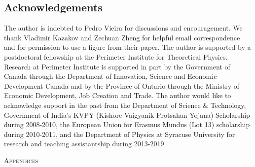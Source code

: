 \documentclass[11pt]{article}
\begin{document}
\subsection*{Acknowledgements}
The author is indebted to Pedro Vieira
for discussions and encouragement. We thank Vladimir Kazakov 
and Zechuan Zheng for helpful email correspondence and for 
permission to use a figure from their paper. The author is supported by a 
postdoctoral fellowship at the Perimeter Institute for Theoretical Physics. Research at Perimeter 
Institute is supported in part by the Government of Canada through the Department of Innovation, 
Science and Economic Development Canada and by the Province of Ontario through 
the Ministry of Economic Development, Job Creation and Trade.
The author would like to acknowledge support in the past from 
the Department of Science \& Technology, Government of India's KVPY
(Kishore Vaigyanik Protsahan Yojana) Scholarship during 2008-2010, 
the European Union for Erasmus Mundus (Lot 13) scholarship during 2010-2011, 
and the Department of Physics at Syracuse University for research and teaching
assistantship during 2013-2019. 
\vspace{6mm}
\appendix
\begin{center} \large{\textsc{Appendices}}\end{center}
\end{document}
